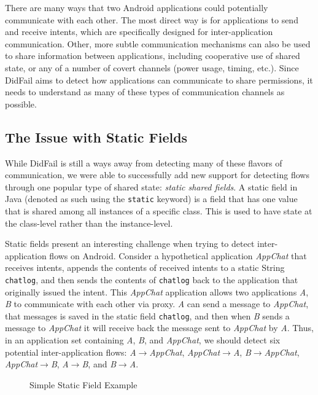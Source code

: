 There are many ways that two Android applications could potentially communicate with each other. The most direct way is for applications to send and receive intents, which are specifically designed for inter-application communication. Other, more subtle communication mechanisms can also be used to share information between applications, including cooperative use of shared state, or any of a number of covert channels (power usage, timing, etc.). Since DidFail aims to detect how applications can communicate to share permissions, it needs to understand as many of these types of communication channels as possible.

\subsection{The Issue with Static Fields}

While DidFail is still a ways away from detecting many of these flavors of communication, we were able to successfully add new support for detecting flows through one popular type of shared state: \emph{static shared fields}. A static field in Java (denoted as such using the \texttt{static} keyword) is a field that has one value that is shared among all instances of a specific class. This is used to have state at the class-level rather than the instance-level.

Static fields present an interesting challenge when trying to detect inter-application flows on Android. Consider a hypothetical application \emph{AppChat} that receives intents, appends the contents of received intents to a static String \texttt{chatlog}, and then sends the contents of \texttt{chatlog} back to the application that originally issued the intent. This \emph{AppChat} application allows two applications \emph{A}, \emph{B} to communicate with each other via proxy. \emph{A} can send a message to \emph{AppChat}, that messages is saved in the static field \texttt{chatlog}, and then when \emph{B} sends a message to \emph{AppChat} it will receive back the message sent to \emph{AppChat} by \emph{A}. Thus, in an application set containing \emph{A}, \emph{B}, and \emph{AppChat}, we should detect six potential inter-application flows: \emph{A$\rightarrow$AppChat}, \emph{AppChat$\rightarrow$A}, \emph{B$\rightarrow$AppChat}, \emph{AppChat$\rightarrow$B}, \emph{A$\rightarrow$B}, and \emph{B$\rightarrow$A}.

\begin{figure}

\caption{Simple Static Field Example}
\label{fig:appchat}
\end{figure}

